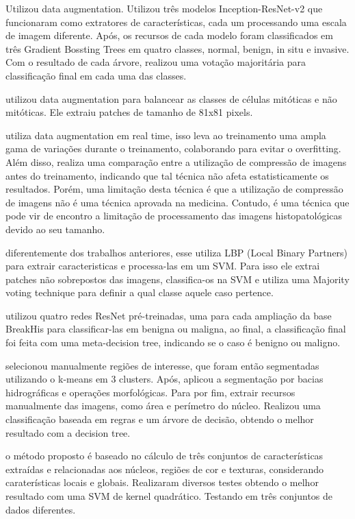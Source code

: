 \documentclass[preprint,12pt,authoryear]{elsarticle}
\begin{document}
\cite{VO2019} Utilizou data augmentation. Utilizou três modelos Inception-ResNet-v2 que funcionaram como extratores de características, cada um processando uma escala de imagem diferente. Após, os recursos de cada modelo foram classificados em três Gradient Bossting Trees em quatro classes, normal, benign, in situ e invasive. Com o resultado de cada árvore, realizou uma votação majoritária para classificação final em cada uma das classes.

\cite{DAS2019} utilizou data augmentation para balancear as classes de células mitóticas e não mitóticas. Ele extraiu patches de tamanho de 81x81 pixels.

\cite{GHAZVINIANZANJANI2019} utiliza data augmentation em real time, isso leva ao treinamento uma ampla gama de variações durante o treinamento, colaborando para evitar o overfitting. Além disso, realiza uma comparação entre a utilização de compressão de imagens antes do treinamento, indicando que tal técnica não afeta estatisticamente os resultados. Porém, uma limitação desta técnica é que a utilização de compressão de imagens não é uma técnica aprovada na medicina. Contudo, é uma técnica que pode vir de encontro a limitação de processamento das imagens histopatológicas devido ao seu tamanho.


\cite{ALQUDAH2019} diferentemente dos trabalhos anteriores, esse utiliza LBP (Local Binary Partners) para extrair caracteristicas e processa-las em um SVM. Para isso ele extrai patches não sobrepostos das imagens, classifica-os na SVM e utiliza uma Majority voting technique para definir a qual classe aquele caso pertence.

\cite{GANDOMKAR2018b} utilizou quatro redes ResNet pré-treinadas, uma para cada ampliação da base BreakHis para classificar-las em benigna ou maligna, ao final, a classificação final foi feita com uma meta-decision tree, indicando se o caso é benigno ou maligno.

\cite{BAKER2018} selecionou manualmente regiões de interesse, que foram então segmentadas utilizando o k-means em 3 clusters. Após, aplicou a segmentação por bacias hidrográficas e operações morfológicas. Para por fim, extrair recursos manualmente das imagens, como área e perímetro do núcleo. Realizou uma classificação baseada em regras e um árvore de decisão, obtendo o melhor resultado com a decision tree.

\cite{FONDON2018} o método proposto é baseado no cálculo de três conjuntos de características extraídas e relacionadas aos núcleos, regiões de cor e texturas, considerando caraterísticas locais e globais. Realizaram diversos testes obtendo o melhor resultado com uma SVM de kernel quadrático. Testando em três conjuntos de dados diferentes.
\end{document}
